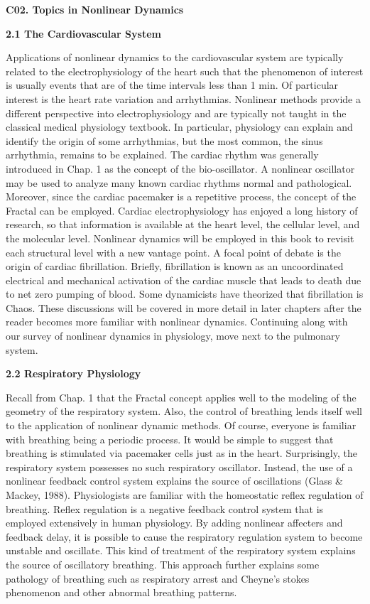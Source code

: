 \documentclass[12pt]{article}
\begin{document}
\textbf{C02. Topics in Nonlinear Dynamics}

\hfill

\textbf{2.1 The Cardiovascular System}

\hfill


Applications of nonlinear dynamics to the cardiovascular system are typically
related to the electrophysiology of the heart such that the phenomenon of interest is usually events that are of the time intervals less than 1 min. Of particular interest is
the heart rate variation and arrhythmias. Nonlinear methods provide a different perspective
into electrophysiology and are typically not taught in the classical medical
physiology textbook. In particular, physiology can explain and identify the origin of
some arrhythmias, but the most common, the sinus arrhythmia, remains to be
explained. The cardiac rhythm was generally introduced in Chap. 1 as the concept
of the bio-oscillator. A nonlinear oscillator may be used to analyze many known
cardiac rhythms normal and pathological. Moreover, since the cardiac pacemaker is
a repetitive process, the concept of the Fractal can be employed. Cardiac electrophysiology
has enjoyed a long history of research, so that information is available
at the heart level, the cellular level, and the molecular level. Nonlinear dynamics
will be employed in this book to revisit each structural level with a new vantage
point. A focal point of debate is the origin of cardiac fibrillation. Briefly, fibrillation
is known as an uncoordinated electrical and mechanical activation of the cardiac
muscle that leads to death due to net zero pumping of blood. Some dynamicists have
theorized that fibrillation is Chaos. These discussions will be covered in more detail
in later chapters after the reader becomes more familiar with nonlinear dynamics.
Continuing along with our survey of nonlinear dynamics in physiology, move next
to the pulmonary system.

\hfill

\textbf{2.2 Respiratory Physiology}

\hfill

Recall from Chap. 1 that the Fractal concept applies well to the modeling of the geometry
of the respiratory system. Also, the control of breathing lends itself well to the
application of nonlinear dynamic methods. Of course, everyone is familiar with
breathing being a periodic process. It would be simple to suggest that breathing is
stimulated via pacemaker cells just as in the heart. Surprisingly, the respiratory system
possesses no such respiratory oscillator. Instead, the use of a nonlinear feedback control
system explains the source of oscillations (Glass \& Mackey, 1988). Physiologists
are familiar with the homeostatic reflex regulation of breathing. Reflex regulation is a
negative feedback control system that is employed extensively in human physiology.
By adding nonlinear affecters and feedback delay, it is possible to cause the respiratory
regulation system to become unstable and oscillate. This kind of treatment of the
respiratory system explains the source of oscillatory breathing. This approach further
explains some pathology of breathing such as respiratory arrest and Cheyne’s stokes
phenomenon and other abnormal breathing patterns.
\end{document}
